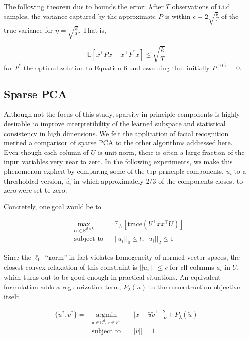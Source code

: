 \documentclass[11pt,letterpaper]{article}
\begin{document}
The following theorem due to \cite{Arora2} bounds the error: After $T$ observations of i.i.d samples, the variance captured by the approximate $P$ is within $\epsilon = 2\sqrt{\frac{k}{T}}$ of the true variance for $\eta = \sqrt{\frac{k}{T}}$. That is, 

\begin{equation}
\mathbb{E}[x^{\top}Px - x^{\top}P^*x] \leq \sqrt{\frac{k}{T}}
\end{equation}
for $P^*$ the optimal solution to Equation 6 and assuming that initially $P^{(0)} = 0$. 


\subsection{Sparse PCA}

Although not the focus of this study, sparsity in principle components is highly desirable to improve interpretibility of the learned subspace and statistical consistency in high dimensions. We felt the application of facial recognition merited a comparison of sparse PCA to the other algorithms addressed here. Even though each column of $U$ is unit norm, there is often a large fraction of the input variables very near to zero. In the following experiments, we make this phenomenon explicit by comparing some of the top principle components, $u_i$ to a thresholded version, $\hat{u_i}$ in which approximately 2/3 of the components closest to zero were set to zero.

Concretely, one goal would be to

\begin{equation}
\begin{aligned}
& \underset{U \in \mathbb{R}^{d \times k}}{\text{max}}
& & \mathbb{E}_{\mathcal{D}}\left[\text{trace}\left(U^{\top}xx^{\top}U\right)\right] \\
& \text{subject to}
& & ||u_i||_0 \leq t, ||u_i||_2 \leq 1
\end{aligned}
\end{equation}

Since the $\ell_0$ ``norm'' in fact violates homogeneity of normed vector spaces, the closest convex relaxation of this constraint is $||u_i||_1 \leq c$ for all columns $u_i$ in $U$, which turns out to be good enough in practical situations. An equivalent formulation adds a regularization term, $P_{\lambda}(\tilde{u})$ to the reconstruction objective itself:

\begin{equation}
\begin{aligned}
\{u^*, v^*\} = & \underset{\tilde{u} \in \mathbb{R}^d, \tilde{v} \in \mathbb{R}^{n}}{\text{argmin}}
& & ||x - \tilde{u}\tilde{v}^{\top}||_F^2 + P_{\lambda}(\tilde{u})\\
& \text{subject to}
& & ||\tilde{v}|| = 1
\end{aligned}
\end{equation}
\end{document}
